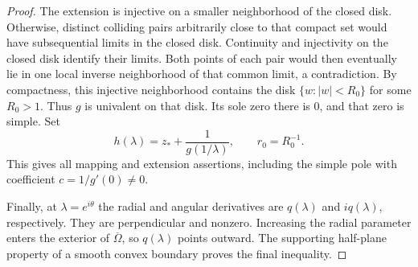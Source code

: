 \documentclass[11pt]{article}
\theoremstyle{remark}\newtheorem{remark}[theorem]{Remark}
\numberwithin{equation}{section}
\begin{document}
\begin{proof}
The extension is injective on a smaller neighborhood of the closed
disk. Otherwise, distinct colliding pairs arbitrarily close to that
compact set would have subsequential limits in the closed disk.
Continuity and injectivity on the closed disk identify their limits.
Both points of each pair would then eventually lie in one local
inverse neighborhood of that common limit, a contradiction. By compactness,
this injective neighborhood contains the disk $\{w:|w|<R_0\}$ for some $R_0>1$.
Thus $g$ is univalent on that disk. Its sole zero there
is $0$, and that zero is simple. Set
\[
 h(\lambda)=z_*+\frac1{g(1/\lambda)},\qquad r_0=R_0^{-1}.
\]
This gives all mapping and extension assertions, including the simple
pole with coefficient $c=1/g'(0)\ne0$.

Finally, at $\lambda=e^{i\theta}$ the radial and angular derivatives
are $q(\lambda)$ and $iq(\lambda)$, respectively. They are perpendicular
and nonzero. Increasing the radial parameter enters the exterior of
$\overline\Omega$, so $q(\lambda)$ points outward. The supporting
half-plane property of a smooth convex boundary proves the final
inequality.
\end{proof}

\end{document}
